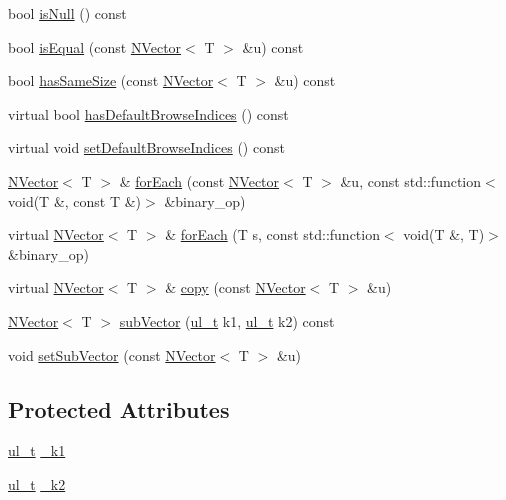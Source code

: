 \begin{DoxyCompactItemize}
\item 
bool \mbox{\hyperlink{class_n_vector_a6d2566f587ad233770ada3aeae0481e1}{is\+Null}} () const
\item 
bool \mbox{\hyperlink{class_n_vector_a496fb038e1612ce56c3b91a9c327c509}{is\+Equal}} (const \mbox{\hyperlink{class_n_vector}{N\+Vector}}$<$ T $>$ \&u) const
\item 
bool \mbox{\hyperlink{class_n_vector_aa9bef4cdf1e57cb0f2e7a3571bdb92a7}{has\+Same\+Size}} (const \mbox{\hyperlink{class_n_vector}{N\+Vector}}$<$ T $>$ \&u) const
\item 
virtual bool \mbox{\hyperlink{class_n_vector_a033460137c1098f8477e6a00e9c2872a}{has\+Default\+Browse\+Indices}} () const
\item 
virtual void \mbox{\hyperlink{class_n_vector_a7f7d365d6ba6e62f627828a528972268}{set\+Default\+Browse\+Indices}} () const
\item 
\mbox{\hyperlink{class_n_vector}{N\+Vector}}$<$ T $>$ \& \mbox{\hyperlink{class_n_vector_a703e598ebcdf39c8f0efa5c619a88d71}{for\+Each}} (const \mbox{\hyperlink{class_n_vector}{N\+Vector}}$<$ T $>$ \&u, const std\+::function$<$ void(T \&, const T \&)$>$ \&binary\+\_\+op)
\item 
virtual \mbox{\hyperlink{class_n_vector}{N\+Vector}}$<$ T $>$ \& \mbox{\hyperlink{class_n_vector_af5cd7c64bfd8eb2335f61d698d6dbf21}{for\+Each}} (T s, const std\+::function$<$ void(T \&, T)$>$ \&binary\+\_\+op)
\item 
virtual \mbox{\hyperlink{class_n_vector}{N\+Vector}}$<$ T $>$ \& \mbox{\hyperlink{class_n_vector_a67128d2ff536b8ccd7a95cb680bd0431}{copy}} (const \mbox{\hyperlink{class_n_vector}{N\+Vector}}$<$ T $>$ \&u)
\item 
\mbox{\hyperlink{class_n_vector}{N\+Vector}}$<$ T $>$ \mbox{\hyperlink{class_n_vector_a8f24d84b8dafde55ba650fd02c188c06}{sub\+Vector}} (\mbox{\hyperlink{group___n_algebra_ga1b140a2034db3f5dfe18a987745df43a}{ul\+\_\+t}} k1, \mbox{\hyperlink{group___n_algebra_ga1b140a2034db3f5dfe18a987745df43a}{ul\+\_\+t}} k2) const
\item 
void \mbox{\hyperlink{class_n_vector_a6fd08a3790831a9ada035f720cb0b11f}{set\+Sub\+Vector}} (const \mbox{\hyperlink{class_n_vector}{N\+Vector}}$<$ T $>$ \&u)
\end{DoxyCompactItemize}
\subsection*{Protected Attributes}
\begin{DoxyCompactItemize}
\item 
\mbox{\hyperlink{group___n_algebra_ga1b140a2034db3f5dfe18a987745df43a}{ul\+\_\+t}} \mbox{\hyperlink{class_n_vector_a355ee9ef9436669e52d0ff4538f85e27}{\+\_\+k1}}
\item 
\mbox{\hyperlink{group___n_algebra_ga1b140a2034db3f5dfe18a987745df43a}{ul\+\_\+t}} \mbox{\hyperlink{class_n_vector_a6591512e0566996c42f3d74c8174385e}{\+\_\+k2}}
\end{DoxyCompactItemize}
